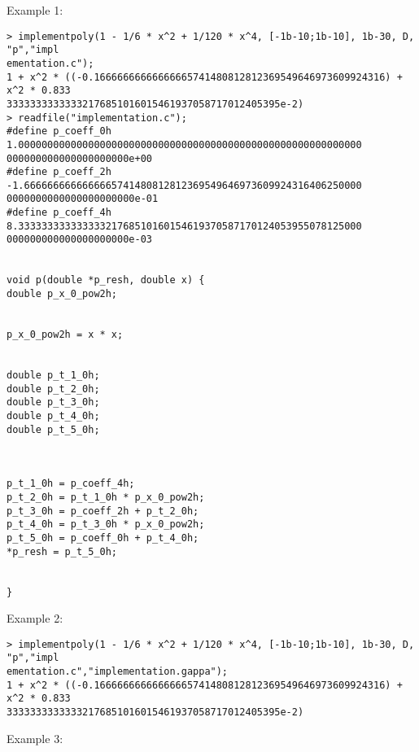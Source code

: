 \noindent Example 1: 
\begin{center}\begin{minipage}{15cm}\begin{Verbatim}[frame=single]
> implementpoly(1 - 1/6 * x^2 + 1/120 * x^4, [-1b-10;1b-10], 1b-30, D, "p","impl
ementation.c");
1 + x^2 * ((-0.16666666666666665741480812812369549646973609924316) + x^2 * 0.833
33333333333332176851016015461937058717012405395e-2)
> readfile("implementation.c");
#define p_coeff_0h 1.00000000000000000000000000000000000000000000000000000000000
000000000000000000000e+00
#define p_coeff_2h -1.6666666666666665741480812812369549646973609924316406250000
0000000000000000000000e-01
#define p_coeff_4h 8.33333333333333321768510160154619370587170124053955078125000
000000000000000000000e-03


void p(double *p_resh, double x) {
double p_x_0_pow2h;


p_x_0_pow2h = x * x;


double p_t_1_0h;
double p_t_2_0h;
double p_t_3_0h;
double p_t_4_0h;
double p_t_5_0h;
 


p_t_1_0h = p_coeff_4h;
p_t_2_0h = p_t_1_0h * p_x_0_pow2h;
p_t_3_0h = p_coeff_2h + p_t_2_0h;
p_t_4_0h = p_t_3_0h * p_x_0_pow2h;
p_t_5_0h = p_coeff_0h + p_t_4_0h;
*p_resh = p_t_5_0h;


}

\end{Verbatim}
\end{minipage}\end{center}
\noindent Example 2: 
\begin{center}\begin{minipage}{15cm}\begin{Verbatim}[frame=single]
> implementpoly(1 - 1/6 * x^2 + 1/120 * x^4, [-1b-10;1b-10], 1b-30, D, "p","impl
ementation.c","implementation.gappa");
1 + x^2 * ((-0.16666666666666665741480812812369549646973609924316) + x^2 * 0.833
33333333333332176851016015461937058717012405395e-2)
\end{Verbatim}
\end{minipage}\end{center}
\noindent Example 3: 

